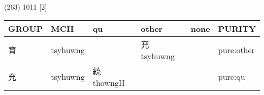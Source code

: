 \documentclass[14pt,a4paper]{scrartcl}
\begin{document}
(263) 1011 {[}2{]}

\begin{longtable}[c]{@{}llllll@{}}
\toprule
\begin{minipage}[b]{0.14\columnwidth}\raggedright\strut
GROUP
\strut\end{minipage} &
\begin{minipage}[b]{0.14\columnwidth}\raggedright\strut
MCH
\strut\end{minipage} &
\begin{minipage}[b]{0.14\columnwidth}\raggedright\strut
qu
\strut\end{minipage} &
\begin{minipage}[b]{0.14\columnwidth}\raggedright\strut
other
\strut\end{minipage} &
\begin{minipage}[b]{0.14\columnwidth}\raggedright\strut
none
\strut\end{minipage} &
\begin{minipage}[b]{0.14\columnwidth}\raggedright\strut
PURITY
\strut\end{minipage}\tabularnewline
\midrule
\endhead
\begin{minipage}[t]{0.14\columnwidth}\raggedright\strut
育
\strut\end{minipage} &
\begin{minipage}[t]{0.14\columnwidth}\raggedright\strut
tsyhuwng
\strut\end{minipage} &
\begin{minipage}[t]{0.14\columnwidth}\raggedright\strut
\strut\end{minipage} &
\begin{minipage}[t]{0.14\columnwidth}\raggedright\strut
充 tsyhuwng
\strut\end{minipage} &
\begin{minipage}[t]{0.14\columnwidth}\raggedright\strut
\strut\end{minipage} &
\begin{minipage}[t]{0.14\columnwidth}\raggedright\strut
pure:other
\strut\end{minipage}\tabularnewline
\begin{minipage}[t]{0.14\columnwidth}\raggedright\strut
充
\strut\end{minipage} &
\begin{minipage}[t]{0.14\columnwidth}\raggedright\strut
tsyhuwng
\strut\end{minipage} &
\begin{minipage}[t]{0.14\columnwidth}\raggedright\strut
統 thowngH
\strut\end{minipage} &
\begin{minipage}[t]{0.14\columnwidth}\raggedright\strut
\strut\end{minipage} &
\begin{minipage}[t]{0.14\columnwidth}\raggedright\strut
\strut\end{minipage} &
\begin{minipage}[t]{0.14\columnwidth}\raggedright\strut
pure:qu
\strut\end{minipage}\tabularnewline
\bottomrule
\end{longtable}
\end{document}
